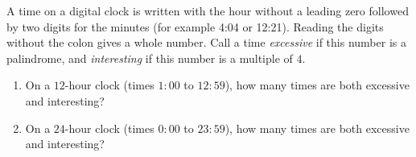 A time on a digital clock is written with the hour without a leading zero followed by two digits for the minutes (for example 4:04 or 12:21). Reading the digits without the colon gives a whole number. Call a time \emph{excessive} if this number is a palindrome, and \emph{interesting} if this number is a multiple of $4$.
\begin{enumerate}
\item[(a)] On a $12$-hour clock (times $1{:}00$ to $12{:}59$), how many times are both excessive and interesting?
\item[(b)] On a $24$-hour clock (times $0{:}00$ to $23{:}59$), how many times are both excessive and interesting?
\end{enumerate}

